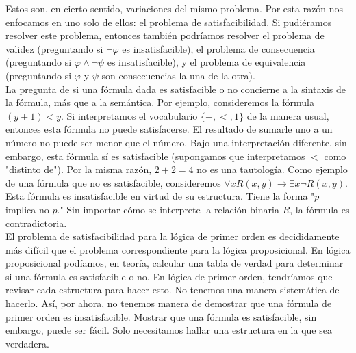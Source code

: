 \message{ !name(main.tex)}\documentclass[12pt,a4paper]{book}
\newcommand{\comillas}[1]{"#1"}
\begin{document}
    Estos son, en cierto sentido, variaciones del mismo problema. Por esta razón nos enfocamos en uno solo de ellos: el
    problema de satisfacibilidad. Si pudiéramos resolver este problema, entonces también podríamos resolver el problema de
    validez (preguntando si $\neg\varphi$ es insatisfacible), el problema de consecuencia (preguntando si
    $\varphi\wedge\neg\psi$ es insatisfacible), y el problema de equivalencia (preguntando si $\varphi$ y $\psi$ son
    consecuencias la una de la otra).\\
    La pregunta de si una fórmula dada es satisfacible o no concierne a la sintaxis de la fórmula, más que a la semántica.
    Por ejemplo, consideremos la fórmula $(y+1)<y$. Si interpretamos el vocabulario $\{+,<,1\}$ de la manera usual, entonces
    esta fórmula no puede satisfacerse. El resultado de sumarle uno a un número no puede ser menor que el número. Bajo una
    interpretación diferente, sin embargo, esta fórmula sí es satisfacible (supongamos que interpretamos $<$ como
    \comillas{distinto de}). Por la misma razón, $2+2=4$ no es una tautología. Como ejemplo de una fórmula que no es
    satisfacible, consideremos $\forall xR(x,y)\rightarrow\exists x\neg R(x,y)$. Esta fórmula es insatisfacible en virtud
    de su estructura. Tiene la forma \comillas{$p$ implica no $p$.} Sin importar cómo se interprete la relación binaria
    $R$, la fórmula es contradictoria.\\
    El problema de satisfacibilidad para la lógica de primer orden es decididamente más difícil que el problema
    correspondiente para la lógica proposicional. En lógica proposicional podíamos, en teoría, calcular una tabla de verdad
    para determinar si una fórmula es satisfacible o no. En lógica de primer orden, tendríamos que revisar cada estructura
    para hacer esto. No tenemos una manera sistemática de hacerlo. Así, por ahora, no tenemos manera de demostrar que una
    fórmula de primer orden es insatisfacible. Mostrar que una fórmula es satisfacible, sin embargo, puede ser fácil. Solo
    necesitamos hallar una estructura en la que sea verdadera.
\end{document}
